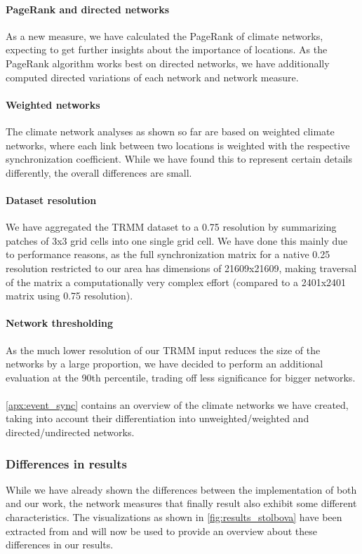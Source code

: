 \paragraph{PageRank and directed networks}
As a new measure, we have calculated the PageRank of climate networks, expecting to get further insights about the importance of locations. As the PageRank algorithm works best on directed networks, we have additionally computed directed variations of each network and network measure.

\paragraph{Weighted networks}
The climate network analyses as shown so far are based on weighted climate networks, where each link between two locations is weighted with the respective synchronization coefficient. While we have found this to represent certain details differently, the overall differences are small.

\paragraph{Dataset resolution}
We have aggregated the TRMM dataset to a {0.75\degree} resolution by summarizing patches of 3x3 grid cells into one single grid cell. We have done this mainly due to performance reasons, as the full synchronization matrix for a native {0.25\degree} resolution restricted to our area has dimensions of 21609x21609, making traversal of the matrix a computationally very complex effort (compared to a 2401x2401 matrix using {0.75\degree} resolution).

\paragraph{Network thresholding}
As the much lower resolution of our TRMM input reduces the size of the networks by a large proportion, we have decided to perform an additional evaluation at the 90th percentile, trading off less significance for bigger networks.
\\ \\
\cref{apx:event_sync} contains an overview of the climate networks we have created, taking into account their differentiation into unweighted/weighted and directed/undirected networks.

\subsubsection{Differences in results}
While we have already shown the differences between the implementation of both \citet{Stolbova.2015} and our work, the network measures that finally result also exhibit some different characteristics. The visualizations as shown in \cref{fig:results_stolbova} have been extracted from \citet{Stolbova.2015} and will now be used to provide an overview about these differences in our results.


